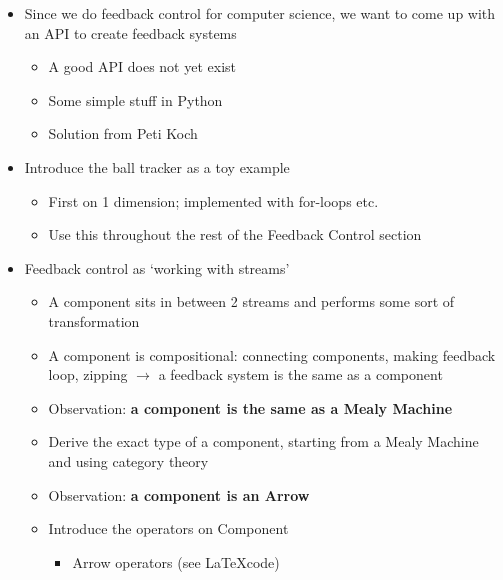 \clearpage
{}

\begin{itemize}
	\item Since we do feedback control for computer science, we want to come up with an API to create feedback systems
	\begin{itemize}
		\item A good API does not yet exist
		\item Some simple stuff in Python
		\item Solution from Peti Koch
	\end{itemize}
	\item Introduce the ball tracker as a toy example
	\begin{itemize}
		\item First on 1 dimension; implemented with for-loops etc.
		\item Use this throughout the rest of the Feedback Control section
	\end{itemize}
	\item Feedback control as ‘working with streams’
	\begin{itemize}
		\item A component sits in between 2 streams and performs some sort of transformation
		\item A component is compositional: connecting components, making feedback loop, zipping $\rightarrow$ a feedback system is the same as a component
		\item Observation: \textbf{a component is the same as a Mealy Machine}
		\item Derive the exact type of a component, starting from a Mealy Machine and using category theory
		\item Observation: \textbf{a component is an Arrow}
		\item Introduce the operators on Component
		\begin{itemize}
			\item Arrow operators (see \LaTeX code)

\end{itemize}
\end{itemize}
\end{itemize}
